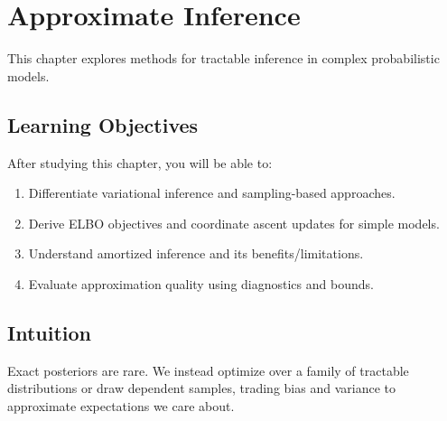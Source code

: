 
\chapter{Approximate Inference}
\label{chap:approximate-inference}

This chapter explores methods for tractable inference in complex probabilistic models.


\section*{Learning Objectives}

After studying this chapter, you will be able to:

\begin{enumerate}
    \item Differentiate variational inference and sampling-based approaches.
    \item Derive ELBO objectives and coordinate ascent updates for simple models.
    \item Understand amortized inference and its benefits/limitations.
    \item Evaluate approximation quality using diagnostics and bounds.
\end{enumerate}


\section*{Intuition}

Exact posteriors are rare. We instead optimize over a family of tractable distributions or draw dependent samples, trading bias and variance to approximate expectations we care about.











